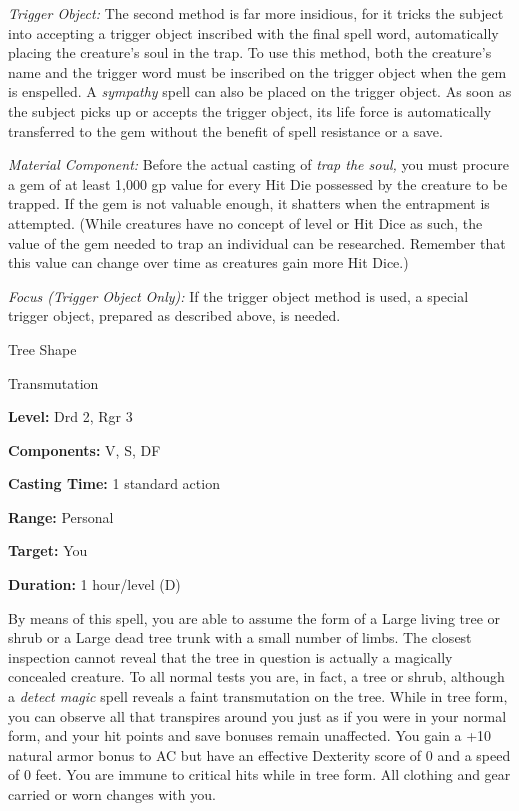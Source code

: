 \documentclass{article}
\begin{document}
\textit{Trigger Object: }The second method is far more insidious, for it tricks 
the subject into accepting a trigger object inscribed with the final spell word, 
automatically placing the creature's soul in the trap. To use this method, both 
the creature's name and the trigger word must be inscribed on the trigger object 
when the gem is enspelled. A \textit{sympathy }spell can also be placed on the 
trigger object. As soon as the subject picks up or accepts the trigger object, 
its life force is automatically transferred to the gem without the benefit of spell 
resistance or a save.

\textit{Material Component: }Before the actual casting of \textit{trap the soul, 
}you must procure a gem of at least 1,000 gp value for every Hit Die possessed 
by the creature to be trapped. If the gem is not valuable enough, it shatters when 
the entrapment is attempted. (While creatures have no concept of level or Hit Dice 
as such, the value of the gem needed to trap an individual can be researched. Remember 
that this value can change over time as creatures gain more Hit Dice.)

\textit{Focus (Trigger Object Only): }If the trigger object method is used, a special 
trigger object, prepared as described above, is needed.

\vspace{12pt}
Tree Shape

Transmutation

\textbf{Level:} Drd 2, Rgr 3

\textbf{Components:} V, S, DF

\textbf{Casting Time:} 1 standard action

\textbf{Range:} Personal

\textbf{Target:} You

\textbf{Duration:} 1 hour/level (D)

By means of this spell, you are able to assume the form of a Large living tree 
or shrub or a Large dead tree trunk with a small number of limbs. The closest inspection 
cannot reveal that the tree in question is actually a magically concealed creature. 
To all normal tests you are, in fact, a tree or shrub, although a \textit{detect 
magic }spell reveals a faint transmutation on the tree. While in tree form, you 
can observe all that transpires around you just as if you were in your normal form, 
and your hit points and save bonuses remain unaffected. You gain a +10 natural 
armor bonus to AC but have an effective Dexterity score of 0 and a speed of 0 feet. 
You are immune to critical hits while in tree form. All clothing and gear carried 
or worn changes with you.
\end{document}
